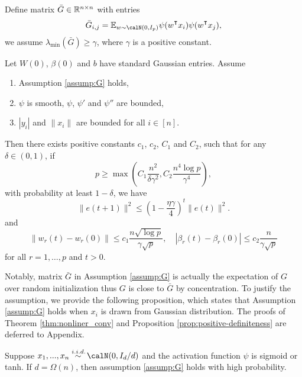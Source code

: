 \begin{assumption}\label{assump:G}
Define matrix $\bar{G} \in \mathbb{R}^{n\times n}$ with entries
\begin{equation*}
    \bar{G}_{i,j} = \E_{w\sim \calN(0,I_p)}\psi(w\transpose x_i) \psi(w\transpose  x_j),
\end{equation*}
we assume $\lambda_{\min}(\bar{G}) \geq \gamma$, where $\gamma$ is a positive constant.
\end{assumption}

\begin{theorem}\label{thm:nonliner_conv}
Let $W(0)$, $\beta(0)$ and $b$ have \iid standard Gaussian entries. Assume
\begin{enumerate}
    \item Assumption \ref{assump:G} holds,
    \item $\psi$ is smooth, $\psi$, $\psi'$ and $\psi''$ are bounded,
    \item $|y_i|$ and $\|x_i\|$ are bounded for all $i\in[n]$.
\end{enumerate}
Then there exists positive constants $c_1$, $c_2$, $C_1$ and $C_2$, such that for any $\delta\in(0,1)$, if 
\begin{equation*}
    p \geq \max(C_1\frac{n^2}{\delta\gamma^2}, C_2\frac{n^4\log p}{\gamma^4}),
\end{equation*}
with probability at least $1-\delta$, we have
\begin{equation}\label{eq:conv}
    \|e(t+1)\|^2 \leq (1-\frac{\eta\gamma}{4})^t\|e(t)\|^2.
\end{equation}
and 
\begin{equation}
\label{eq:weights}
    \|w_r(t)-w_r(0)\| \leq c_1\frac{n\sqrt{\log p}}{\gamma\sqrt p}, \quad |\beta_r(t)-\beta_r(0)| \leq c_2\frac{n}{\gamma\sqrt p}
\end{equation}
for all $r=1,\ldots, p$ and $t>0$.
\end{theorem}

Notably, matrix $\bar{G}$ in Assumption \ref{assump:G} is actually the expectation of $G$ over random initialization thus $G$ is close to $\bar{G}$ by concentration. To justify the assumption, we provide the following proposition, which states that Assumption \ref{assump:G} holds when $x_i$ is drawn from Gaussian distribution. The proofs of Theorem \ref{thm:nonliner_conv} and Proposition \ref{prop:positive-definiteness} are deferred to Appendix.

\begin{proposition}\label{prop:positive-definiteness}
Suppose $x_1,...,x_n \overset{\iid}{\sim} \calN(0,I_d/d)$ and the activation function $\psi$ is sigmoid or tanh. If $d=\Omega(n)$, then assumption \ref{assump:G} holds with high probability.
\end{proposition}




